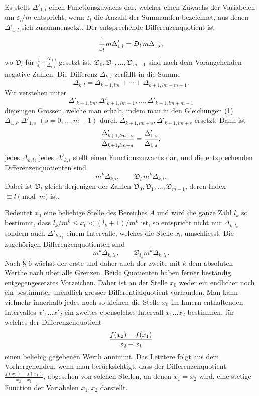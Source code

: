 Es stellt $\Delta'_{1,l}$ einen Functionszuwachs dar, welcher einen Zuwachs der Variabelen um $\varepsilon_l/m$ entspricht, wenn $\varepsilon_l$ die Anzahl der Summanden bezeichnet, aus denen $\Delta'_{1,l}$ sich zusammensetzt. Der entsprechende Differenzenquotient ist
\[
 {1\over\varepsilon_l}m\Delta'_{1,l}=\mathfrak D_l\,m\Delta_{1,l},
\]
wo $\mathfrak D_l$ für $\frac1{\varepsilon_l}\cdot\frac{\Delta'_{1,l}}{\Delta_{1,l}}$ gesetzt ist. $\mathfrak D_0,\mathfrak D_1,\ldots,\mathfrak D_{m-1}$ sind nach dem Vorangehenden negative Zahlen. Die Differenz $\Delta_{k,l}$ zerfällt in die Summe
\[
 \Delta_{k,l}=\Delta_{k+1,lm}+\cdots+\Delta_{k+1,lm+m-1}.
\]
Wir verstehen unter
\[
 \Delta'_{k+1,lm},\Delta'_{k+1,lm+1},\ldots,\Delta'_{k+1,lm+m-1}
\]
diejenigen Grössen, welche man erhält, indem man in den Gleichungen (1) $\Delta_{1,s},\Delta'_{1,s}$ $(s=0,
\ldots,m-1)$ durch $\Delta_{k+1,lm+s},\Delta'_{k+1,lm+s}$ ersetzt. Dann ist
\[
 {\Delta'_{k+1,lm+s}\over\Delta_{k+1,lm+s}}={\Delta'_{1,s}\over\Delta_{1,s}},
\]
jedes $\Delta_{k,l}$, jedes $\Delta'_{k,l}$ stellt einen Functionszuwachs dar, und die entsprechenden Differenzenquotienten sind
\[
 m^k\Delta_{k,l},
 \qquad
 \mathfrak D_l\,m^k\Delta_{k,l}.
\]
Dabei ist $\mathfrak D_l$ gleich derjenigen der Zahlen $\mathfrak D_0,\mathfrak D_1,\ldots,\mathfrak D_{m-1}$, deren Index $\equiv l\pmod m$ ist.

Bedeutet $x_0$ eine beliebige Stelle des Bereiches $A$ und wird die ganze Zahl $l_k$ so bestimmt, dass $l_k/m^k\le x_0<(l_k+1)/m^k$ ist, so entspricht nicht nur $\Delta_{k,l_k}$ sondern auch $\Delta'_{k,l_k}$ einem Intervalle, welches die Stelle $x_0$ umschliesst. Die zugehörigen Differenzenquotienten sind
\[
 m^k\Delta_{k,l_k},
 \qquad
 \mathfrak D_{l_k}m^k\Delta_{k,l_k}.
\]
Nach § 6 wächst der erste und daher auch der zweite mit $k$ dem absoluten Werthe nach über alle Grenzen. Beide Quotienten haben ferner beständig entgegengesetztes Vorzeichen. Daher ist an der Stelle $x_0$ weder ein endlicher noch ein bestimmter unendlich grosser Differentialquotient vorhanden. Man kann vielmehr innerhalb jedes noch so kleinen die Stelle $x_0$ im Innern enthaltenden Intervalles $x'_1\ldots x'_2$ ein zweites ebensolches Intervall $x_1\ldots x_2$ bestimmen, für welches der Differenzenquotient
\[
 {f(x_2)-f(x_1)\over x_2-x_1}
\]
einen beliebig gegebenen Werth annimmt. Das Letztere folgt aus dem Vorhergehenden, wenn man berücksichtigt, dass der Differenzenquotient $\frac{f(x_2)-f(x_1)}{x_2-x_1}$, abgesehen von solchen Stellen, an denen $x_1=x_2$ wird, eine stetige Function der Variabelen $x_1,x_2$ darstellt.

